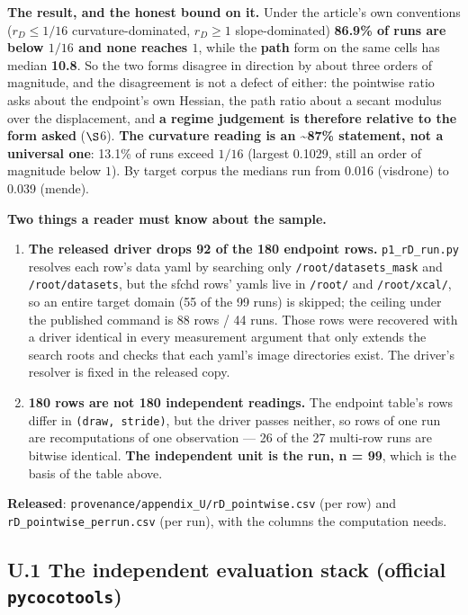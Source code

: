 \documentclass[pdflatex,sn-mathphys-ay]{sn-jnl}
\begin{document}
\textbf{The result, and the honest bound on it.} Under the article's own conventions ($r_D\le 1/16$ curvature-dominated, $r_D\ge1$ slope-dominated) \textbf{86.9\% of runs are below $1/16$ and none reaches $1$}, while the \textbf{path} form on the same cells has median \textbf{10.8}. So the two forms disagree in direction by about three orders of magnitude, and the disagreement is not a defect of either: the pointwise ratio asks about the endpoint's own Hessian, the path ratio about a secant modulus over the displacement, and \textbf{a regime judgement is therefore relative to the form asked} ($\S$6). \textbf{The curvature reading is an \textasciitilde{}87\% statement, not a universal one}: 13.1\% of runs exceed $1/16$ (largest 0.1029, still an order of magnitude below $1$). By target corpus the medians run from 0.016 (visdrone) to 0.039 (mende).

\textbf{Two things a reader must know about the sample.}

\begin{enumerate}
\item \textbf{The released driver drops 92 of the 180 endpoint rows.} \texttt{p1\_rD\_run.py} resolves each row's data yaml by searching only \texttt{/root/datasets\_mask} and \texttt{/root/datasets}, but the sfchd rows' yamls live in \texttt{/root/} and \texttt{/root/xcal/}, so an entire target domain (55 of the 99 runs) is skipped; the ceiling under the published command is 88 rows / 44 runs. Those rows were recovered with a driver identical in every measurement argument that only extends the search roots and checks that each yaml's image directories exist. The driver's resolver is fixed in the released copy.
\item \textbf{180 rows are not 180 independent readings.} The endpoint table's rows differ in \texttt{(draw, stride)}, but the driver passes neither, so rows of one run are recomputations of one observation --- 26 of the 27 multi-row runs are bitwise identical. \textbf{The independent unit is the run, n = 99}, which is the basis of the table above.
\end{enumerate}

\textbf{Released}: \texttt{provenance/appendix\_U/rD\_pointwise.csv} (per row) and \texttt{rD\_pointwise\_perrun.csv} (per run), with the columns the computation needs.

\subsection*{U.1 The independent evaluation stack (official \texttt{pycocotools})}
\end{document}
